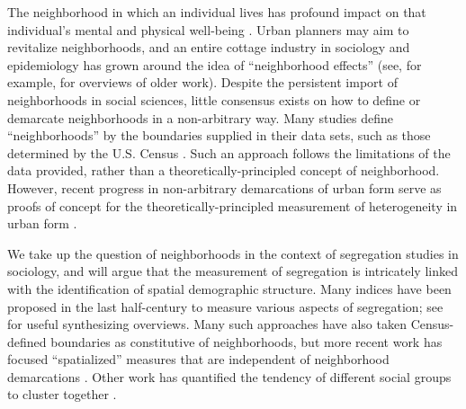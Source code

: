 
	The neighborhood in which an individual lives has profound impact on that individual's mental and physical well-being \cite{Ludwig2012, Ludwig2013}. Urban planners may aim to revitalize neighborhoods, and an entire cottage industry in sociology and epidemiology has grown around the idea of ``neighborhood effects'' (see, for example, \cite{DiezRoux2001, Sampson2002} for overviews of older work). Despite the persistent import of neighborhoods in social sciences, little consensus exists on how to define or demarcate neighborhoods in a non-arbitrary way. Many studies define ``neighborhoods'' by the boundaries supplied in their data sets, such as those determined by the U.S. Census \cite{Dietz2002}. Such an approach follows the limitations of the data provided, rather than a theoretically-principled concept of neighborhood. However, recent progress in non-arbitrary demarcations of urban form serve as proofs of concept for the theoretically-principled measurement of heterogeneity in urban form \cite{Rozenfeld2008,Rozenfeld2011}.

	We take up the question of neighborhoods in the context of segregation studies in sociology, and will argue that the measurement of segregation is intricately linked with the identification of spatial demographic structure. Many indices have been proposed in the last half-century to measure various aspects of segregation; see \cite{Massey1988, Reardon2002} for useful synthesizing overviews. Many such approaches have also taken Census-defined boundaries as constitutive of neighborhoods, but more recent work has focused ``spatialized'' measures that are independent of neighborhood demarcations \cite{Reardon2004, Roberto2015a, Roberto2015,Wong2004, Wong1999, Lee2008}. Other work has quantified the tendency of different social groups to cluster together \cite{Louf2015}. 


